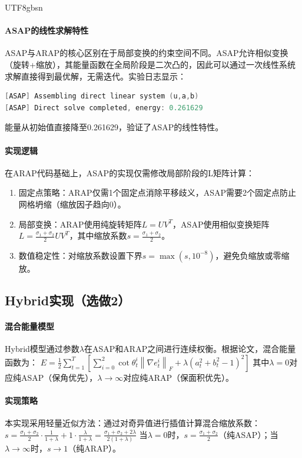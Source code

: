 \documentclass[10pt,a4paper,twocolumn]{article}
\newcommand{\fro}[1]{\left\|#1\right\|_F}
\begin{document}
\begin{CJK*}{UTF8}{gbsn}
\paragraph{ASAP的线性求解特性}
ASAP与ARAP的核心区别在于局部变换的约束空间不同。ASAP允许相似变换（旋转+缩放），其能量函数在全局阶段是二次凸的，因此可以通过一次线性系统求解直接得到最优解，无需迭代。实验日志显示：
\begin{lstlisting}[language=C++, caption={ASAP solving log}]
[ASAP] Assembling direct linear system (u,a,b)
[ASAP] Direct solve completed, energy: 0.261629
\end{lstlisting}
能量从初始值直接降至0.261629，验证了ASAP的线性特性。

\paragraph{实现逻辑}
在ARAP代码基础上，ASAP的实现仅需修改局部阶段的L矩阵计算：
\begin{enumerate}
\item 固定点策略：ARAP仅需1个固定点消除平移歧义，ASAP需要2个固定点防止网格坍缩（缩放因子趋向0）。
\item 局部变换：ARAP使用纯旋转矩阵$L=UV^T$，ASAP使用相似变换矩阵$L=\frac{\sigma_1+\sigma_2}{2}UV^T$，其中缩放系数$s=\frac{\sigma_1+\sigma_2}{2}$。
\item 数值稳定性：对缩放系数设置下界$s=\max(s, 10^{-8})$，避免负缩放或零缩放。
\end{enumerate}

\subsection{Hybrid实现（选做2）}

\paragraph{混合能量模型}
Hybrid模型通过参数$\lambda$在ASAP和ARAP之间进行连续权衡。根据论文，混合能量函数为：
$E = \frac{1}{2}\sum_{t=1}^T\left[ \sum_{i=0}^2 \cot\theta_t^i \fro{\nabla e_t^i} + \lambda(a_t^2+b_t^2-1)^2 \right]$
其中$\lambda=0$对应纯ASAP（保角优先），$\lambda\to\infty$对应纯ARAP（保面积优先）。

\paragraph{实现策略}
本实现采用轻量近似方法：通过对奇异值进行插值计算混合缩放系数：
$s = \frac{\sigma_1+\sigma_2}{2} \cdot \frac{1}{1+\lambda} + 1 \cdot \frac{\lambda}{1+\lambda} = \frac{\sigma_1+\sigma_2 + 2\lambda}{2(1+\lambda)}$
当$\lambda=0$时，$s=\frac{\sigma_1+\sigma_2}{2}$（纯ASAP）；当$\lambda\to\infty$时，$s\to1$（纯ARAP）。


\end{CJK*}
\end{document}

